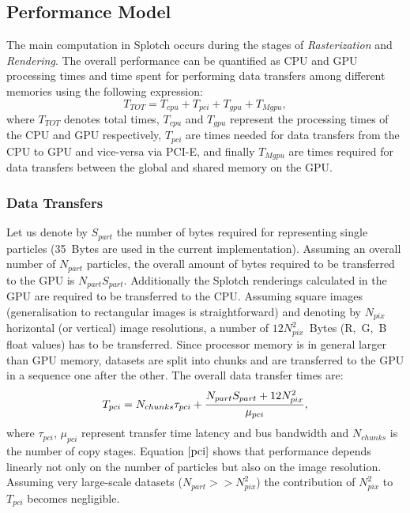 \documentclass[smallextended]{svjour3}
\begin{document}
\subsection{Performance Model}
\label{sec:model}

The main computation in Splotch occurs during the stages of {\it Rasterization} and {\it Rendering}.
The overall performance can be quantified as CPU and GPU processing times 
and time spent for performing data transfers among different memories using the following expression:
\begin{equation}\label{Ts}
T_{TOT} = T_{cpu} + T_{pci} + T_{gpu} + T_{Mgpu},
\end{equation}
where $T_{TOT}$ denotes total times, 
$T_{cpu}$ and $T_{gpu}$ represent the processing times of the CPU and GPU respectively, $T_{pci}$ are times needed for data transfers from the CPU to GPU and vice-versa via PCI-E, and finally $T_{Mgpu}$ are times required for data transfers between the global and shared memory on the GPU. 

\subsubsection{Data Transfers}
Let us denote by $S_{part}$ the number of bytes required for representing single particles (35~Bytes are used in the current implementation). Assuming an overall number of $N_{part}$ particles, the overall amount of bytes required to be transferred to the GPU is $N_{part} S_{part}$. Additionally the Splotch renderings calculated in the GPU are required to be transferred to the CPU. Assuming square images (generalisation to rectangular images is straightforward) and denoting by $N_{pix}$ horizontal (or vertical) image resolutions, a number of $12 N_{pix}^2$~Bytes (R,~G,~B float values) has to be transferred. 
Since processor memory is in general larger than GPU memory,
datasets are split into chunks and are transferred to the GPU in a sequence one after the other. The overall data transfer times are:
\begin{equation}\label{pci}
T_{pci} =  N_{chunks} \tau_{pci} + {N_{part} S_{part} + 12 N_{pix}^2 \over 
\mu_{pci}},
\end{equation}
where $\tau_{pci}$, $\mu_{pci}$ represent transfer time latency and bus bandwidth and $N_{chunks}$ is the number of copy stages. Equation $\eqref{pci}$ shows that performance depends linearly not only on the number of particles but also on the image resolution. Assuming very large-scale datasets ($N_{part} >> N_{pix}^2$) the contribution of $N_{pix}^2$ to $T_{pci}$ becomes negligible. 
 
\end{document}

